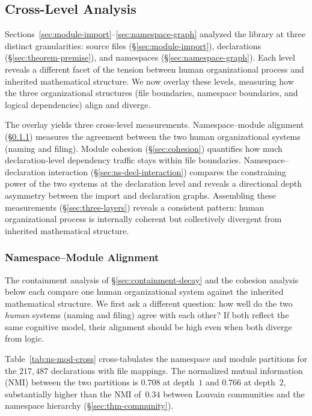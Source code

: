 \subsection{Cross-Level Analysis}
\label{sec:cross_level}
\label{sec:module-declaration}

Sections~\ref{sec:module-import}--\ref{sec:namespace-graph} analyzed the library at three distinct granularities: source files (\S\ref{sec:module-import}), declarations (\S\ref{sec:theorem-premise}), and namespaces (\S\ref{sec:namespace-graph}). Each level reveals a different facet of the tension between human organizational process and inherited mathematical structure. We now overlay these levels, measuring how the three organizational structures (file boundaries, namespace boundaries, and logical dependencies) align and diverge.

The overlay yields three cross-level measurements. Namespace--module alignment (\S\ref{sec:ns-mod-cross}) measures the agreement between the two human organizational systems (naming and filing). Module cohesion (\S\ref{sec:cohesion}) quantifies how much declaration-level dependency traffic stays within file boundaries. Namespace--declaration interaction (\S\ref{sec:ns-decl-interaction}) compares the constraining power of the two systems at the declaration level and reveals a directional depth asymmetry between the import and declaration graphs. Assembling these measurements (\S\ref{sec:three-layers}) reveals a consistent pattern: human organizational process is internally coherent but collectively divergent from inherited mathematical structure.

\subsubsection{Namespace--Module Alignment}
\label{sec:ns-mod-cross}

The containment analysis of \S\ref{sec:containment-decay} and the cohesion analysis below each compare one human organizational system against the inherited mathematical structure. We first ask a different question: how well do the two \emph{human} systems (naming and filing) agree with each other? If both reflect the same cognitive model, their alignment should be high even when both diverge from logic.

Table~\ref{tab:ns-mod-cross} cross-tabulates the namespace and module partitions for the $217{,}487$ declarations with file mappings. The normalized mutual information (NMI) between the two partitions is $0.708$ at depth~$1$ and $0.766$ at depth~$2$, substantially higher than the NMI of~$0.34$ between Louvain communities and the namespace hierarchy (\S\ref{sec:thm-community}).

